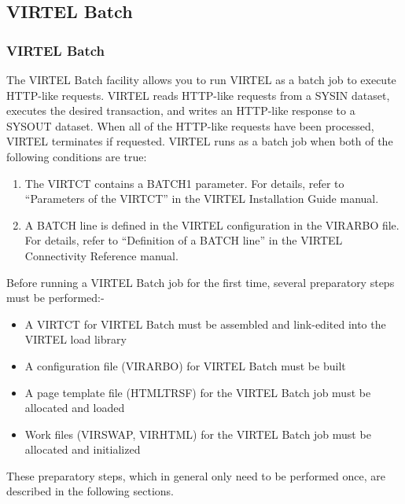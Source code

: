 \documentclass[letterpaper,10pt,english]{sphinxmanual}
\begin{document}
\subsection{VIRTEL Batch}
\label{\detokenize{User_Guide:virtel-batch}}

\subsubsection{VIRTEL Batch}
\label{\detokenize{User_Guide:id8}}
The VIRTEL Batch facility allows you to run VIRTEL as a batch job to execute HTTP-like requests. VIRTEL reads HTTP-like
requests from a SYSIN dataset, executes the desired transaction, and writes an HTTP-like response to a SYSOUT
dataset. When all of the HTTP-like requests have been processed, VIRTEL terminates if requested.
VIRTEL runs as a batch job when both of the following conditions are true:
\begin{enumerate}
\item {} 
The VIRTCT contains a BATCH1 parameter. For details, refer to “Parameters of the VIRTCT” in the VIRTEL Installation Guide manual.

\item {} 
A BATCH line is defined in the VIRTEL configuration in the VIRARBO file. For details, refer to “Definition of a BATCH line” in the VIRTEL Connectivity Reference manual.

\end{enumerate}

Before running a VIRTEL Batch job for the first time, several preparatory steps must be performed:-
\begin{itemize}
\item {} 
A VIRTCT for VIRTEL Batch must be assembled and link-edited into the VIRTEL load library

\item {} 
A configuration file (VIRARBO) for VIRTEL Batch must be built

\item {} 
A page template file (HTMLTRSF) for the VIRTEL Batch job must be allocated and loaded

\item {} 
Work files (VIRSWAP, VIRHTML) for the VIRTEL Batch job must be allocated and initialized

\end{itemize}

These preparatory steps, which in general only need to be performed once, are described in the following sections.
\end{document}
